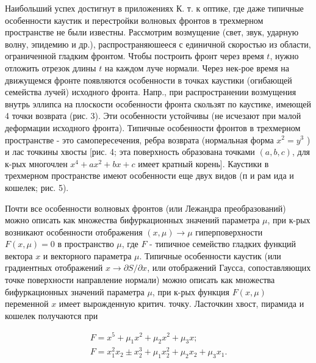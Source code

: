 \documentclass[10pt]{article}
\begin{document}
Наибольший успех достигнут в приложениях К. т. к оптике, где даже типичные особенности каустик и перестройки волновых фронтов в трехмерном пространстве не были известны. Рассмотрим возмущение (свет, звук, ударную волну, эпидемию и др.), распространяюшееся с единичной скоростью из области, ограниченной гладким фронтом. Чтобы построить фронт через время $t$, нужно отложить отрезок длины $t$ на каждом луче нормали. Через нек-рое время на движущемся фронте появляются особенности в точках каустики (огибающей семейства лучей) исходного фронта. Напр., при распространении возмущения внутрь эллипса на плоскости особенности фронта скользят по каустике, имеющей 4 точки возврата (рис. 3). Эти особенности устойчивы (не исчезают при малой деформации исходного фронта). Типичные особенности фронтов в трехмерном пространстве - это самопересечения, ребра возврата (нормальная форма $x^{2}=y^{3}$ ) и лас точкины хвосты [рис. 4; эта поверхность образована точками $(a, b, c)$, для к-рых многочлен $x^{4}+a x^{2}+b x+c$ имеет кратный корень]. Каустики в трехмерном пространстве имеют особенности еще двух видов (п и рам ида и кошелек; рис. 5).



Почти все особенности волновых фронтов (или Лежандра преобразований) можно описать как множества бифуркационных значений параметра $\mu$, при к-рых возникают особенности отображения $(x, \mu) \rightarrow \mu$ гиперповерхности $F(x, \mu)=0$ в пространство $\mu$, где $F$ - типичное семейство гладких функций вектора $x$ и векторного параметра $\mu$. Типичные особенности каустик (или градиентных отображений $x \rightarrow \partial S / \partial x$, или отображений Гаусса, сопоставляющих точке поверхности направление нормали) можно описать как множества бифуркационных значений параметра $\mu$, при к-рых функция $F(x, \mu)$ переменной $x$ имеет вырожденную критич. точку. Ласточкин хвост, пирамида и кошелек получаются при



\[

\begin{gathered}

F=x^{5}+\mu_{1} x^{2}+\mu_{2} x^{2}+\mu_{3} x ; \\

F=x_{1}^{2} x_{2} \pm x_{2}^{3}+\mu_{1} x_{2}^{2}+\mu_{2} x_{2}+\mu_{3} x_{1} .

\end{gathered}

\]
\end{document}
